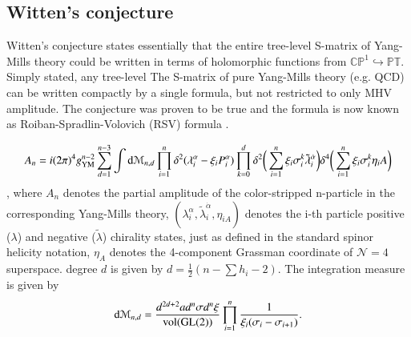 \documentclass{article}
\begin{document}
      \subsection{Witten's conjecture}%
        \label{sub: Witten's conjecture}
        Witten's conjecture states essentially that the entire
        tree-level S-matrix of Yang-Mills theory could be written
        in terms of holomorphic functions from $ \mathbb{CP}^{1}
        \hookrightarrow  \mathbb{PT} $. Simply stated, any tree-level
        The S-matrix of pure Yang-Mills theory (e.g. QCD) can be
        written compactly by a single formula, but not restricted
        to only MHV amplitude. The conjecture was proven to be true
        and the formula is now known as Roiban-Spradlin-Volovich
        (RSV) formula \cite{roiban2004tree}.

        \begin{align}
          \label{name}
          A_n = i(2\pi)^4
          g^{n-2}_{\textnormal{YM}}\sum^{n-3}_{d=1} \int
          \textnormal{d} \mathcal{M}_{n,d} \prod^n_{i=1} \delta^2
          (\lambda_i^{\alpha}- \xi_i P^{\alpha}_i) \prod_{k=0}^{d}
          \delta^2 \bigg{(} \sum_{i=1}^n \xi_i \sigma_i^k \tilde
          \lambda_i^{\dot{\alpha}} \bigg{)} \delta^4 \bigg{(}
          \sum_{i=1}^n \xi_i \sigma_i^k \eta_i A
          \bigg{)}
        \end{align}, where $A_n$ denotes the partial amplitude of
        the color-stripped n-particle in the corresponding Yang-Mills
        theory, $(\lambda_i^{\alpha}, \tilde
        \lambda_i^{\dot{\alpha}}, \eta_{iA})$ denotes the i-th
        particle positive ($\lambda$) and negative ($\tilde
        \lambda$) chirality states, just as defined in the
        standard spinor helicity notation, $\eta_A$ denotes the
        4-component Grassman coordinate of $\mathcal{N} = 4$
        superspace. degree $d$ is given by $ d = \frac{1}{2}( n -
        \sum h_i -2 ) $. The integration measure is given by 
        \begin{align}
          \label{integration measure}
          \textnormal{d} \mathcal{M}_{n,d} = \frac{d^{2d+2}a d^n
          \sigma d^n \xi}{\textnormal{vol}(\textnormal{GL}(2))}
          \prod_{i=1}^{n} \frac{1}{\xi_i (\sigma_i -
          \sigma_{i+1})}. 
        \end{align}
\end{document}
